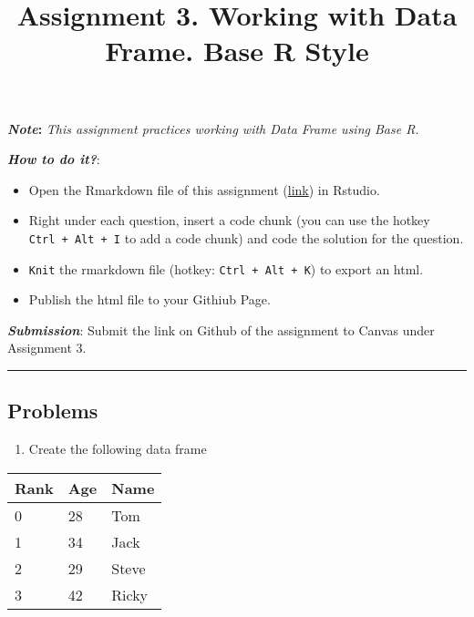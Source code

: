 \documentclass[
]{article}
\title{Assignment 3. Working with Data Frame. Base R Style}
\author{}
\date{\vspace{-2.5em}}
\providecommand{\tightlist}{%
  \setlength{\itemsep}{0pt}\setlength{\parskip}{0pt}}
\begin{document}
\maketitle

\textbf{\emph{Note}:} \emph{This assignment practices working with Data
Frame using Base R.}

\textbf{\emph{How to do it?}}:

\begin{itemize}
\item
  Open the Rmarkdown file of this assignment
  (\href{fa2021_assignment3.Rmd}{link}) in Rstudio.
\item
  Right under each question, insert a code chunk (you can use the hotkey
  \texttt{Ctrl\ +\ Alt\ +\ I} to add a code chunk) and code the solution
  for the question.
\item
  \texttt{Knit} the rmarkdown file (hotkey: \texttt{Ctrl\ +\ Alt\ +\ K})
  to export an html.
\item
  Publish the html file to your Githiub Page.
\end{itemize}

\textbf{\emph{Submission}}: Submit the link on Github of the assignment
to Canvas under Assignment 3.

\begin{center}\rule{0.5\linewidth}{0.5pt}\end{center}

\hypertarget{problems}{%
\subsection{Problems}\label{problems}}

\hfill\break

\begin{enumerate}
\def\labelenumi{\arabic{enumi}.}
\tightlist
\item
  Create the following data frame
\end{enumerate}

\begin{longtable}[]{@{}lll@{}}
\toprule
Rank & Age & Name \\
\midrule
\endhead
0 & 28 & Tom \\
1 & 34 & Jack \\
2 & 29 & Steve \\
3 & 42 & Ricky \\
\bottomrule
\end{longtable}
\end{document}
